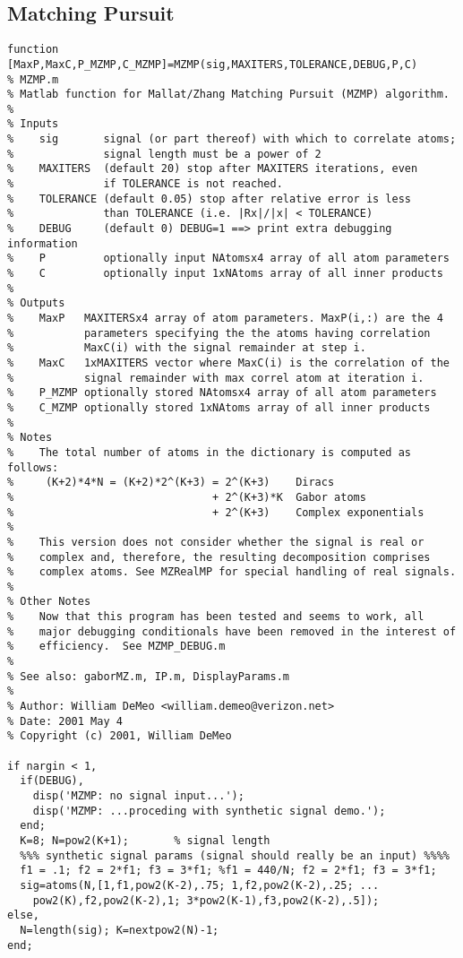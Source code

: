 \subsection{Matching Pursuit}\label{sec:MZMP}
\begin{small}\begin{verbatim}
function [MaxP,MaxC,P_MZMP,C_MZMP]=MZMP(sig,MAXITERS,TOLERANCE,DEBUG,P,C)
% MZMP.m 
% Matlab function for Mallat/Zhang Matching Pursuit (MZMP) algorithm.
%
% Inputs
%    sig       signal (or part thereof) with which to correlate atoms;
%              signal length must be a power of 2
%    MAXITERS  (default 20) stop after MAXITERS iterations, even
%              if TOLERANCE is not reached.
%    TOLERANCE (default 0.05) stop after relative error is less 
%              than TOLERANCE (i.e. |Rx|/|x| < TOLERANCE)
%    DEBUG     (default 0) DEBUG=1 ==> print extra debugging information
%    P         optionally input NAtomsx4 array of all atom parameters
%    C         optionally input 1xNAtoms array of all inner products
%
% Outputs
%    MaxP   MAXITERSx4 array of atom parameters. MaxP(i,:) are the 4
%           parameters specifying the the atoms having correlation
%           MaxC(i) with the signal remainder at step i.
%    MaxC   1xMAXITERS vector where MaxC(i) is the correlation of the
%           signal remainder with max correl atom at iteration i.
%    P_MZMP optionally stored NAtomsx4 array of all atom parameters
%    C_MZMP optionally stored 1xNAtoms array of all inner products
%
% Notes
%    The total number of atoms in the dictionary is computed as follows:
%     (K+2)*4*N = (K+2)*2^(K+3) = 2^(K+3)    Diracs
%                               + 2^(K+3)*K  Gabor atoms
%                               + 2^(K+3)    Complex exponentials
%
%    This version does not consider whether the signal is real or
%    complex and, therefore, the resulting decomposition comprises
%    complex atoms. See MZRealMP for special handling of real signals.
%
% Other Notes
%    Now that this program has been tested and seems to work, all
%    major debugging conditionals have been removed in the interest of
%    efficiency.  See MZMP_DEBUG.m
%
% See also: gaborMZ.m, IP.m, DisplayParams.m
%
% Author: William DeMeo <william.demeo@verizon.net>
% Date: 2001 May 4
% Copyright (c) 2001, William DeMeo

if nargin < 1, 
  if(DEBUG),
    disp('MZMP: no signal input...');
    disp('MZMP: ...proceding with synthetic signal demo.');
  end;
  K=8; N=pow2(K+1);       % signal length
  %%% synthetic signal params (signal should really be an input) %%%%
  f1 = .1; f2 = 2*f1; f3 = 3*f1; %f1 = 440/N; f2 = 2*f1; f3 = 3*f1;
  sig=atoms(N,[1,f1,pow2(K-2),.75; 1,f2,pow2(K-2),.25; ...
    pow2(K),f2,pow2(K-2),1; 3*pow2(K-1),f3,pow2(K-2),.5]);
else,  
  N=length(sig); K=nextpow2(N)-1; 
end;


\end{verbatim}
\end{small}
